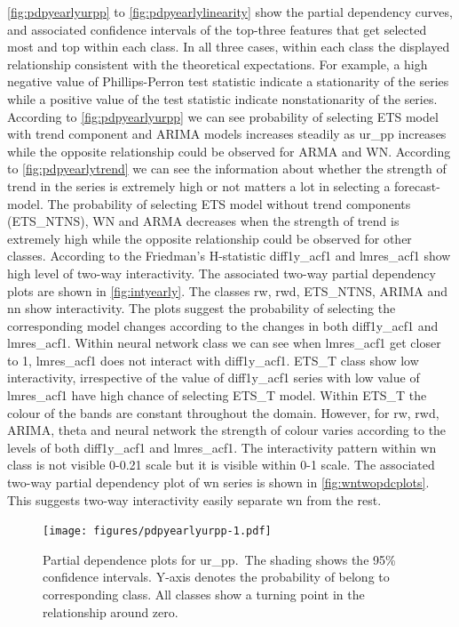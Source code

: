 \documentclass[11pt,a4paper,]{article}
\begin{document}
\autoref{fig:pdpyearlyurpp} to \autoref{fig:pdpyearlylinearity} show the partial dependency curves, and associated confidence intervals of the top-three features that get selected most and top within each class. In all three cases, within each class the displayed relationship consistent with the theoretical expectations. For example, a high negative value of Phillips-Perron test statistic indicate a stationarity of the series while a positive value of the test statistic indicate nonstationarity of the series. According to \autoref{fig:pdpyearlyurpp} we can see probability of selecting ETS model with trend component and ARIMA models increases steadily as ur\_pp increases while the opposite relationship could be observed for ARMA and WN. According to \autoref{fig:pdpyearlytrend} we can see the information about whether the strength of trend in the series is extremely high or not matters a lot in selecting a forecast-model. The probability of selecting ETS model without trend components (ETS\_NTNS), WN and ARMA decreases when the strength of trend is extremely high while the opposite relationship could be observed for other classes. According to the Friedman's H-statistic diff1y\_acf1 and lmres\_acf1 show high level of two-way interactivity. The associated two-way partial dependency plots are shown in \autoref{fig:intyearly}. The classes rw, rwd, ETS\_NTNS, ARIMA and nn show interactivity. The plots suggest the probability of selecting the corresponding model changes according to the changes in both diff1y\_acf1 and lmres\_acf1. Within neural network class we can see when lmres\_acf1 get closer to 1, lmres\_acf1 does not interact with diff1y\_acf1. ETS\_T class show low interactivity, irrespective of the value of diff1y\_acf1 series with low value of lmres\_acf1 have high chance of selecting ETS\_T model. Within ETS\_T the colour of the bands are constant throughout the domain. However, for rw, rwd, ARIMA, theta and neural network the strength of colour varies according to the levels of both diff1y\_acf1 and lmres\_acf1. The interactivity pattern within wn class is not visible 0-0.21 scale but it is visible within 0-1 scale. The associated two-way partial dependency plot of wn series is shown in \autoref{fig:wntwopdcplots}. This suggests two-way interactivity easily separate wn from the rest.

\begin{figure}
\centering
\texttt{[image: figures/pdpyearlyurpp-1.pdf]}
\caption{\label{fig:pdpyearlyurpp}Partial dependence plots for ur\_pp.~The shading shows the 95\% confidence intervals. Y-axis denotes the probability of belong to corresponding class. All classes show a turning point in the relationship around zero.}
\end{figure}
\end{document}
